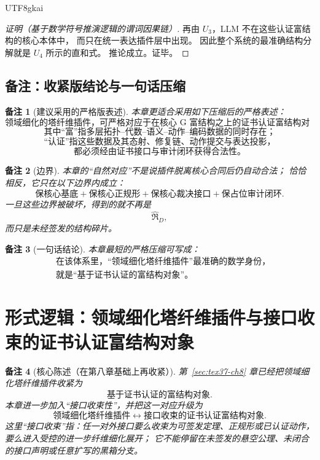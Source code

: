 \documentclass[12pt]{article}
\newtheorem{remark}{备注}[section]
\begin{document}
\begin{CJK*}{UTF8}{gkai}
\begin{proof}[证明（基于数学符号推演逻辑的谓词因果链）]
再由 $U_3$，LLM 不在这些认证富结构的核心本体中，
而只在统一表达插件层中出现。
因此整个系统的最准确结构分解就是 $U_4$ 所示的直和式。
推论成立。证毕。
\end{proof}

\subsection{备注：收紧版结论与一句话压缩}
\label{subsec:tex37-ch8-remarks}

\begin{remark}[建议采用的严格版表述]
本章更适合采用如下压缩后的严格表述：
\[
  \boxed{
    \text{领域细化的塔纤维插件，可严格对应于在核心 G 富结构之上的证书认证富结构对象。}
  }
\]
\[
  \boxed{
    \text{其中“富”指多层拓扑--代数--语义--动作--编码数据的同时存在；}
  }
\]
\[
  \boxed{
    \text{“认证”指这些数据及其态射、修复链、动作提交与表达投影，}
  }
\]
\[
  \boxed{
    \text{都必须经由证书接口与审计闭环获得合法性。}
  }
\]
\end{remark}

\begin{remark}[边界]
本章的“自然对应”不是说插件脱离核心合同后仍自动合法；
恰恰相反，它只在以下边界内成立：
\[
  \text{保核心基底}
  +
  \text{保核心正规形}
  +
  \text{保核心裁决接口}
  +
  \text{保占位审计闭环}.
\]
一旦这些边界被破坏，得到的就不再是
\[
  \widehat{\mathfrak R}_D,
\]
而只是未经签发的结构碎片。
\end{remark}

\begin{remark}[一句话结论]
本章最短的严格压缩可写成：
\[
  \boxed{
    \begin{aligned}
      &\text{在该体系里，“领域细化塔纤维插件”最准确的数学身份，}\\
      &\text{就是“基于证书认证的富结构对象”。}
    \end{aligned}
  }
\]
\end{remark}

\clearpage

\section{形式逻辑：领域细化塔纤维插件与接口收束的证书认证富结构对象}
\label{sec:tex37-ch9}

\begin{remark}[核心陈述（在第八章基础上再收紧）]
第~\ref{sec:tex37-ch8} 章已经把领域细化塔纤维插件收紧为
\[
  \text{基于证书认证的富结构对象}.
\]
本章进一步加入“接口收束性”，并把这一对应升级为
\[
  \boxed{
    \text{领域细化塔纤维插件}
    \longleftrightarrow
    \text{接口收束的证书认证富结构对象}.
  }
\]
这里“接口收束”指：任一对外接口要么收束为可签发定理、正规形或已认证动作，
要么进入受控的进一步纤维细化展开；
它不能停留在未签发的悬空公理、未闭合的接口声明或任意扩写的黑箱分支。
\end{remark}


\end{CJK*}
\end{document}
